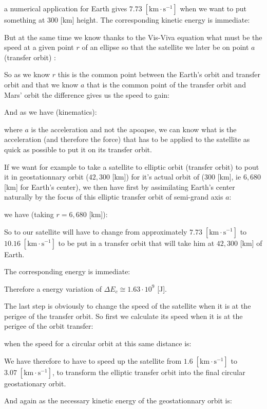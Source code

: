 	
	a numerical application for Earth gives $7.73\;[\text{km}\cdot\text{s}^{-1}]$ when we want to put something at $300$ [km] height. The corresponding kinetic energy is immediate:
	
	
	But at the same time we know thanks to the Vis-Viva equation what must be the speed at a given point $r$ of an ellipse so that the satellite we later be on point $a$ (transfer orbit) :
	
	So as we know $r$ this is the common point between the Earth's orbit and transfer orbit and that we know $a$ that is the common point of the transfer orbit and Mars' orbit the difference gives us the speed to gain:
	
	And as we have (kinematics):
	
	where $a$ is the acceleration and not the apoapse, we can know what is the acceleration (and therefore the force) that has to be applied to the satellite as quick as possible to put it on its transfer orbit.
	
	If we want for example to take a satellite to elliptic orbit (transfer orbit) to pout it in geostationnary orbit ($42,300$ [km]) for it's actual orbit of ($300$ [km], ie $6,680$ [km] for Earth's center), we then have first by assimilating Earth's center naturally by the focus of this elliptic transfer orbit of semi-grand axis $a$:
	
	we have (taking $r=6,680$ [km]):
	
	So to our satellite will have to change from approximately $7.73\;[\text{km}\cdot \text{s}^{-1}]$ to $10.16\;[\text{km}\cdot \text{s}^{-1}]$ to be put in a transfer orbit that will take him at $42,300$ [km] of Earth.
	
	The corresponding energy is immediate:
	
	Therefore a energy variation of $\Delta E_c\cong 1.63\cdot 10^9$ [J].
	
	The last step is obviously to change the speed of the satellite when it is at the perigee of the transfer orbit. So first we calculate its speed when it is at the perigee of the orbit transfer:
	
	when the speed for a circular orbit at this same distance is:
	
	We have therefore to have to speed up the satellite from $1.6\;[\text{km}\cdot \text{s}^{-1}]$ to $3.07\;[\text{km}\cdot\text{s}^{-1}]$, to transform the elliptic transfer orbit into the final circular geostationary orbit.
	
	And again as the necessary kinetic energy of the geostationnary orbit is:
	
